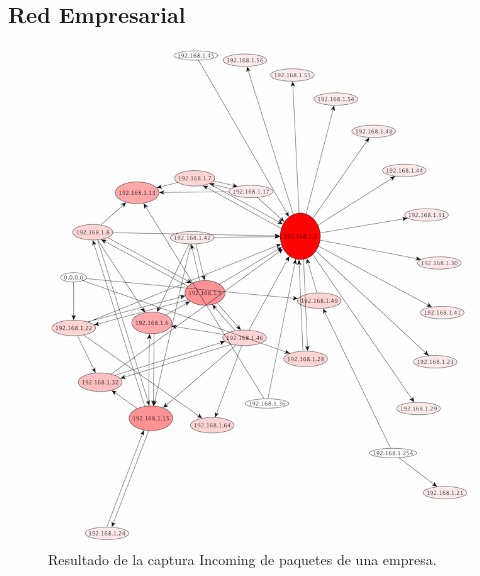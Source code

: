 \documentclass[10pt, a4paper]{article}
\begin{document}
\begin{itemize}
\end{itemize}

\subsection{Red Empresarial}

\begin{figure}[H] %
\begin{center}
\includegraphics[width=400pt]{../imgs/tiarg-incoming.png}
\caption{Resultado de la captura Incoming de paquetes de una empresa.}
\end{center}
\end{figure}
\end{document}

